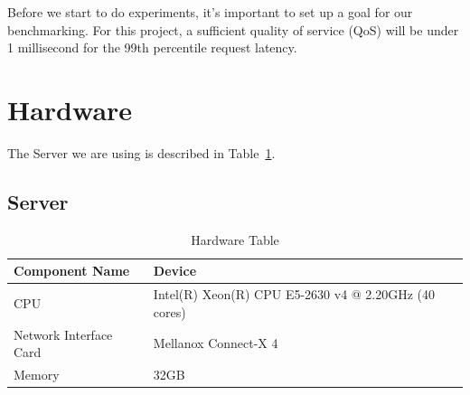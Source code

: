\documentclass[bsc,frontabs,twoside,singlespacing,parskip,deptreport]{infthesis}     %
\begin{document}

Before we start to do experiments, it's important to set up a goal for our benchmarking. For this project, a sufficient quality of service (QoS) will be under 1 millisecond for the 99th percentile request latency. 










\section{Hardware}

The Server we are using is described in  Table~\ref{tab:hardware}.


\subsection{Server}


\begin{table}[h]
\begin{tabular}{ |p{6cm}||p{6cm}|  }


 \hline
 Component Name & Device \\
 \hline
CPU & Intel(R) Xeon(R) CPU E5-2630 v4 @ 2.20GHz (40 cores) \\
 \hline
Network Interface Card & Mellanox Connect-X 4 \\
\hline
Memory & 32GB \\
 \hline
 
 
\end{tabular}
\caption{Hardware Table}
\label{tab:hardware}

\end{table}
\end{document}
